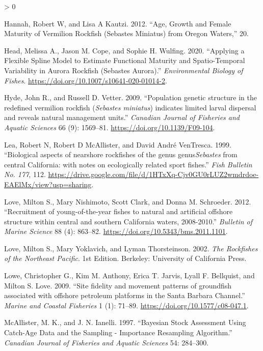 \documentclass[11pt,
  english,
  a4paper,
]{article}
\newlength{\cslhangindent}
\newenvironment{CSLReferences}[2] %
 {%
  \setlength{\parindent}{0pt}
  \ifodd #1 \everypar{\setlength{\hangindent}{\cslhangindent}}\ignorespaces\fi
  \ifnum #2 > 0
  \setlength{\parskip}{#2\baselineskip}
  \fi
 }%
 {}
\begin{document}
\begin{CSLReferences}{1}{0}
\leavevmode\hypertarget{ref-hannah_age_2012}{}%
Hannah, Robert W, and Lisa A Kautzi. 2012. {``Age, Growth and Female Maturity of Vermilion Rockfish (Sebastes Miniatus) from Oregon Waters,''} 20.

\leavevmode\hypertarget{ref-head_fxnalmatspline_2020}{}%
Head, Melissa A., Jason M. Cope, and Sophie H. Wulfing. 2020. {``Applying a Flexible Spline Model to Estimate Functional Maturity and Spatio-Temporal Variability in Aurora Rockfish (Sebastes Aurora).''} \emph{Environmental Biology of Fishes}. \url{https://doi.org/10.1007/s10641-020-01014-2}.

\leavevmode\hypertarget{ref-Hyde2009}{}%
Hyde, John R., and Russell D. Vetter. 2009. {``{Population genetic structure in the redefined vermilion rockfish (\emph{Sebastes miniatus}) indicates limited larval dispersal and reveals natural management units}.''} \emph{Canadian Journal of Fisheries and Aquatic Sciences} 66 (9): 1569--81. \url{https://doi.org/10.1139/F09-104}.

\leavevmode\hypertarget{ref-Lea1999}{}%
Lea, Robert N, Robert D McAllister, and David André VenTresca. 1999. {``{Biological aspects of nearshore rockfishes of the genus genus\emph{Sebastes} from central California: with notes on ecologically related sport fishes}.''} \emph{Fish Bulletin No. 177}, 112. \url{https://drive.google.com/file/d/1HTxXq-Cjv0GU0rLUZ2wmdrdoe-EAElMx/view?usp=sharing}.

\leavevmode\hypertarget{ref-Love2012a}{}%
Love, Milton S., Mary Nishimoto, Scott Clark, and Donna M. Schroeder. 2012. {``{Recruitment of young-of-the-year fishes to natural and artificial offshore structure within central and southern California waters, 2008-2010}.''} \emph{Bulletin of Marine Science} 88 (4): 863--82. \url{https://doi.org/10.5343/bms.2011.1101}.

\leavevmode\hypertarget{ref-love_rockfishes_2002}{}%
Love, Milton S., Mary Yoklavich, and Lyman Thorsteinson. 2002. \emph{The Rockfishes of the Northeast Pacific}. 1st Edition. Berkeley: University of California Press.

\leavevmode\hypertarget{ref-Lowe2009}{}%
Lowe, Christopher G., Kim M. Anthony, Erica T. Jarvis, Lyall F. Bellquist, and Milton S. Love. 2009. {``{Site fidelity and movement patterns of groundfish associated with offshore petroleum platforms in the Santa Barbara Channel}.''} \emph{Marine and Coastal Fisheries} 1 (1): 71--89. \url{https://doi.org/10.1577/c08-047.1}.

\leavevmode\hypertarget{ref-mcallister_bayesian_1997}{}%
McAllister, M. K., and J. N. Ianelli. 1997. {``Bayesian Stock Assessment Using Catch-Age Data and the Sampling - Importance Resampling Algorithm.''} \emph{Canadian Journal of Fisheries and Aquatic Sciences} 54: 284--300.


\end{CSLReferences}
\end{document}
